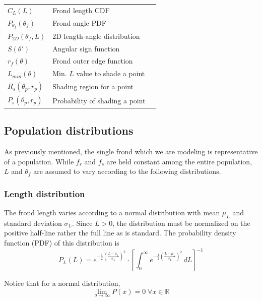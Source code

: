 \documentclass[10pt]{article}
\newenvironment{mcfig}
	{\par\medskip\noindent\minipage{\linewidth}}
	{\endminipage\par\medskip}
\begin{document}
\begin{multicols}{2}
\begin{mcfig}
\begin{tabular}{@{}llc@{}}
		$C_L(L)$                  & Frond length CDF                    & \\
		$P_{\theta_f}(\theta_f)$  & Frond angle PDF                     & \\
		$P_{2D}(\theta_f,L)$      & 2D length-angle distribution        & \\
		$S(\theta')$              & Angular sign function               & \\
		$r_f(\theta)$             & Frond outer edge function           & \\ 
		$L_{min}(\theta)$         & Min. $L$ value to shade a point     & \\
		$R_s(\theta_p,r_p)$       & Shading region for a point          & \\
		$P_s(\theta_p,r_p)$       & Probability of shading a point      & \\ \bottomrule
	\end{tabular}
	\label{fig:variables}
\end{mcfig}

\subsection{Population distributions}
\label{sec:distributions}
As previously mentioned, the single frond which we are modeling is representative of a population.
While $f_r$ and $f_s$ are held constant among the entire population, $L$ and $\theta_f$ are assumed to vary according to the following distributions.

\subsubsection{Length distribution}
\label{sec:length_dist}
The frond length varies according to a normal distribution with mean $\mu_L$ and standard deviation $\sigma_L$. Since $L>0$, the distribution must be normalized on the positive half-line rather the full line as is standard. The probability density function (PDF) of this distribution is
\begin{equation}
	P_L(L) = e^{-\frac{1}{2}\left(\frac{L-\mu_L}{\sigma_L}\right)^2}
	\cdot \left[ \int_0^\infty e^{-\frac{1}{2}\left(\frac{L-\mu_L}{\sigma_L}\right)^2}\,dL  \right] ^{-1}
\end{equation}

Notice that for a normal distribution,
\begin{equation}
	\displaystyle \lim_{\sigma \to \infty}P(x) = 0 \;\forall x \in \mathbb{R}
\end{equation}


\end{multicols}
\end{document}
